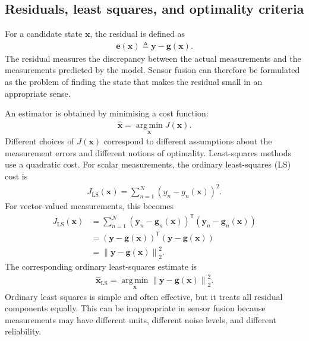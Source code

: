\subsection{Residuals, least squares, and optimality criteria}
For a candidate state $\mathbf{x}$, the residual is defined as
\begin{align}
\mathbf{e}(\mathbf{x}) \triangleq \mathbf{y} - \mathbf{g}(\mathbf{x}).
\end{align}
The residual measures the discrepancy between the actual measurements and the measurements predicted by the model. Sensor fusion can therefore be formulated as the problem of finding the state that makes the residual small in an appropriate sense.

An estimator is obtained by minimising a cost function:
\begin{align}
\widehat{\mathbf{x}} = \operatorname*{arg\,min}_{\mathbf{x}} J(\mathbf{x}).
\end{align}
Different choices of $J(\mathbf{x})$ correspond to different assumptions about the measurement errors and different notions of optimality. Least-squares methods use a quadratic cost. For scalar measurements, the ordinary least-squares (LS) cost is
\begin{align}
J_{\mathrm{LS}}(\mathbf{x}) = \sum_{n=1}^{N}\left(y_n-g_n(\mathbf{x})\right)^2.
\end{align}
For vector-valued measurements, this becomes
\begin{align}
J_{\mathrm{LS}}(\mathbf{x}) &=\sum_{n=1}^{N}\left(\mathbf{y}_n-\mathbf{g}_n(\mathbf{x})\right)^{\mathsf T}\left(\mathbf{y}_n-\mathbf{g}_n(\mathbf{x})\right) \nonumber \\
&= \left( \mathbf{y} - \mathbf{g}(\mathbf{x}) \right)^{\mathsf T}\left(\mathbf{y}-\mathbf{g}(\mathbf{x})\right) \nonumber \\
& = \left\|\mathbf{y} - \mathbf{g}(\mathbf{x}) \right\|_2^2 . %
\end{align}
The corresponding ordinary least-squares estimate is
\begin{align}
\widehat{\mathbf{x}}_{\mathrm{LS}} = \operatorname*{arg\,min}_{\mathbf{x}} \left\| \mathbf{y} - \mathbf{g}(\mathbf{x}) \right\|_2^2.
\end{align}
Ordinary least squares is simple and often effective, but it treats all residual components equally. This can be inappropriate in sensor fusion because measurements may have different units, different noise levels, and different reliability.

